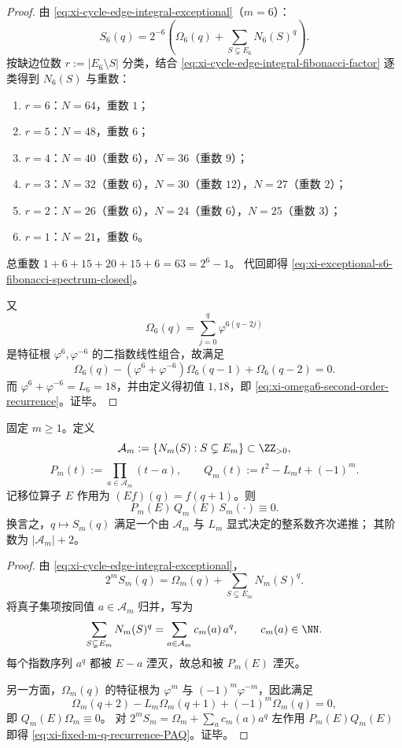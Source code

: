 \begin{proof}
由 \eqref{eq:xi-cycle-edge-integral-exceptional}（\(m=6\)）：
\[
S_6(q)=2^{-6}\!\left(\Omega_6(q)+\sum_{S\subsetneq E_6}N_6(S)^q\right).
\]
按缺边位数 \(r:=|E_6\setminus S|\) 分类，结合
\eqref{eq:xi-cycle-edge-integral-fibonacci-factor} 逐类得到 \(N_6(S)\) 与重数：
\begin{enumerate}
  \item \(r=6\)：\(N=64\)，重数 \(1\)；
  \item \(r=5\)：\(N=48\)，重数 \(6\)；
  \item \(r=4\)：\(N=40\)（重数 \(6\)），\(N=36\)（重数 \(9\)）；
  \item \(r=3\)：\(N=32\)（重数 \(6\)），\(N=30\)（重数 \(12\)），\(N=27\)（重数 \(2\)）；
  \item \(r=2\)：\(N=26\)（重数 \(6\)），\(N=24\)（重数 \(6\)），\(N=25\)（重数 \(3\)）；
  \item \(r=1\)：\(N=21\)，重数 \(6\)。
\end{enumerate}
总重数 \(1+6+15+20+15+6=63=2^6-1\)。
代回即得 \eqref{eq:xi-exceptional-s6-fibonacci-spectrum-closed}。

又
\[
\Omega_6(q)=\sum_{j=0}^{q}\varphi^{6(q-2j)}
\]
是特征根 \(\varphi^6,\varphi^{-6}\) 的二指数线性组合，故满足
\[
\Omega_6(q)-(\varphi^6+\varphi^{-6})\Omega_6(q-1)+\Omega_6(q-2)=0.
\]
而 \(\varphi^6+\varphi^{-6}=L_6=18\)，并由定义得初值 \(1,18\)，即 \eqref{eq:xi-omega6-second-order-recurrence}。证毕。
\end{proof}

\begin{proposition}\label{prop:xi-terminal-replica-softcore-fixed-m-q-recurrence-PAQ}
固定 \(m\ge 1\)。定义
\[
\mathcal A_m:=\{N_m(S):S\subsetneq E_m\}\subset\ZZ_{>0},
\]
\[
P_m(t):=\prod_{a\in\mathcal A_m}(t-a),
\qquad
Q_m(t):=t^2-L_m t+(-1)^m.
\]
记移位算子 \(E\) 作用为 \((Ef)(q)=f(q+1)\)。则
\begin{equation}\label{eq:xi-fixed-m-q-recurrence-PAQ}
P_m(E)\,Q_m(E)\,S_m(\cdot)\equiv 0.
\end{equation}
换言之，\(q\mapsto S_m(q)\) 满足一个由 \(\mathcal A_m\) 与 \(L_m\) 显式决定的整系数齐次递推；
其阶数为 \(|\mathcal A_m|+2\)。
\end{proposition}

\begin{proof}
由 \eqref{eq:xi-cycle-edge-integral-exceptional}，
\[
2^mS_m(q)=\Omega_m(q)+\sum_{S\subsetneq E_m}N_m(S)^q.
\]
将真子集项按同值 \(a\in\mathcal A_m\) 归并，写为
\[
\sum_{S\subsetneq E_m}N_m(S)^q=\sum_{a\in\mathcal A_m}c_m(a)\,a^q,\qquad c_m(a)\in\NN.
\]
每个指数序列 \(a^q\) 都被 \(E-a\) 湮灭，故总和被 \(P_m(E)\) 湮灭。

另一方面，\(\Omega_m(q)\) 的特征根为 \(\varphi^m\) 与 \((-1)^m\varphi^{-m}\)，因此满足
\[
\Omega_m(q+2)-L_m\Omega_m(q+1)+(-1)^m\Omega_m(q)=0,
\]
即 \(Q_m(E)\Omega_m\equiv 0\)。
对
\(
2^mS_m=\Omega_m+\sum_{a}c_m(a)a^q
\)
左作用 \(P_m(E)Q_m(E)\) 即得
\eqref{eq:xi-fixed-m-q-recurrence-PAQ}。证毕。
\end{proof}

\endinput
